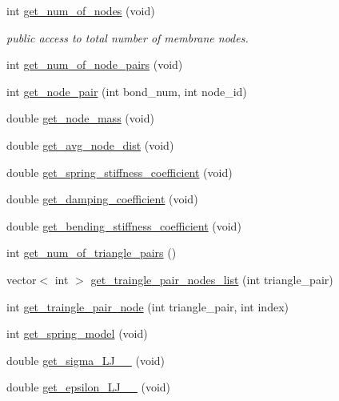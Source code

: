 \begin{DoxyCompactItemize}
\item 
int \mbox{\hyperlink{classMembrane_a7ab07bf9d307d2e2b8e457a9167fff78}{get\+\_\+num\+\_\+of\+\_\+nodes}} (void)
\begin{DoxyCompactList}\small\item\em public access to total number of membrane nodes. \end{DoxyCompactList}\item 
int \mbox{\hyperlink{classMembrane_a8dba8af8f79eeb588edfea309e530368}{get\+\_\+num\+\_\+of\+\_\+node\+\_\+pairs}} (void)
\item 
int \mbox{\hyperlink{classMembrane_a522229db4c05a0a927c1c9ac3bf29915}{get\+\_\+node\+\_\+pair}} (int bond\+\_\+num, int node\+\_\+id)
\item 
double \mbox{\hyperlink{classMembrane_a7b6e284f4bba349da2ddc1c14f914dc7}{get\+\_\+node\+\_\+mass}} (void)
\item 
double \mbox{\hyperlink{classMembrane_a32ed30019d57e8d4e51341709a8997f2}{get\+\_\+avg\+\_\+node\+\_\+dist}} (void)
\item 
double \mbox{\hyperlink{classMembrane_a7076d2f0d0e1d39e74d35f6dbb193103}{get\+\_\+spring\+\_\+stiffness\+\_\+coefficient}} (void)
\item 
double \mbox{\hyperlink{classMembrane_abb4dd35ac28213842ed42cf76cf96293}{get\+\_\+damping\+\_\+coefficient}} (void)
\item 
double \mbox{\hyperlink{classMembrane_ae1e3082fdde5dbef11fb6c3b7cc97c0a}{get\+\_\+bending\+\_\+stiffness\+\_\+coefficient}} (void)
\item 
int \mbox{\hyperlink{classMembrane_a7aefd8327b0c02828efc321fd1ae7f07}{get\+\_\+num\+\_\+of\+\_\+triangle\+\_\+pairs}} ()
\item 
vector$<$ int $>$ \mbox{\hyperlink{classMembrane_a6aaf6705d45dcc224eceace9670c15f9}{get\+\_\+traingle\+\_\+pair\+\_\+nodes\+\_\+list}} (int triangle\+\_\+pair)
\item 
int \mbox{\hyperlink{classMembrane_a30add8aa4bd6a4f03cdb3fd3e1b68ff9}{get\+\_\+traingle\+\_\+pair\+\_\+node}} (int triangle\+\_\+pair, int index)
\item 
int \mbox{\hyperlink{classMembrane_aa567e00a8c4c4b4a57547b84e80e418e}{get\+\_\+spring\+\_\+model}} (void)
\item 
double \mbox{\hyperlink{classMembrane_af24a7560c8a747fc22c0f21358373334}{get\+\_\+sigma\+\_\+\+L\+J\+\_\+\_}} (void)
\item 
double \mbox{\hyperlink{classMembrane_a7546dc8ac92366b2d485e8088e05af9e}{get\+\_\+epsilon\+\_\+\+L\+J\+\_\+\_}} (void)

\end{DoxyCompactItemize}
